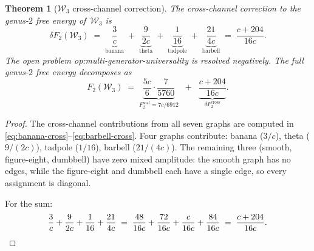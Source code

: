 \documentclass[11pt]{article}
\theoremstyle{plain}
\newtheorem{theorem}{Theorem}[section]
\theoremstyle{definition}
\theoremstyle{remark}
\newcommand{\cW}{\mathcal{W}}
\begin{document}
\begin{theorem}[$\cW_3$ cross-channel correction]
\label{thm:genus2}
The cross-channel correction to the genus-$2$ free energy
of~$\cW_3$ is
\begin{equation}\label{eq:cross-channel-total}
 \delta F_2(\cW_3)
 \;=\;
 \underbrace{\frac{3}{c}}_{\text{banana}}
 \;+\;
 \underbrace{\frac{9}{2c}}_{\text{theta}}
 \;+\;
 \underbrace{\frac{1}{16}}_{\text{tadpole}}
 \;+\;
 \underbrace{\frac{21}{4c}}_{\text{barbell}}
 \;=\;
 \frac{c + 204}{16c}.
\end{equation}
The open problem \textup{op:multi-generator-universality}
is resolved negatively. The full genus-$2$
free energy decomposes as
\[
 F_2(\cW_3)
 \;=\;
 \underbrace{\frac{5c}{6}\cdot\frac{7}{5760}}_{\displaystyle
 F_2^{\mathrm{scal}} = 7c/6912}
 \;\;+\;\;
 \underbrace{\frac{c + 204}{16c}}_{\displaystyle
 \delta F_2^{\mathrm{cross}}}.
\]
\end{theorem}

\begin{proof}
The cross-channel contributions from all seven graphs
are computed in
\eqref{eq:banana-cross}--\eqref{eq:barbell-cross}.
Four graphs contribute: banana ($3/c$), theta ($9/(2c)$),
tadpole ($1/16$), barbell ($21/(4c)$). The remaining three (smooth, figure-eight,
dumbbell) have zero mixed amplitude: the smooth graph has no edges,
while the figure-eight and dumbbell each have a single edge, so
every assignment is diagonal.

For the sum:
\[
 \frac{3}{c} + \frac{9}{2c} + \frac{1}{16} + \frac{21}{4c}
 \;=\;
 \frac{48}{16c} + \frac{72}{16c} + \frac{c}{16c} + \frac{84}{16c}
 \;=\;
 \frac{c + 204}{16c}.
 \qedhere
\]
\end{proof}
\end{document}
